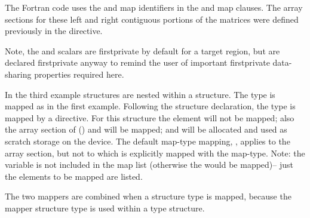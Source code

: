 The Fortran code uses the  and  map identifiers in the
 and  map clauses.  
The array sections for these left and right contiguous portions of the matrices 
were defined previously in the  directive.

Note, the  and  scalars are firstprivate 
by default for a target region, but are declared firstprivate anyway
to remind the user of important firstprivate data-sharing properties required here.



\pagebreak
In the third example  structures are
nested within a  structure. The  type is mapped
as in the first example.  Following the  structure declaration, 
the  type is mapped by a  directive. 
For this structure the  element will not be mapped;
also the array section of  () and  will be mapped; and
 will be allocated and used as scratch storage on the device.
The default map-type mapping, , applies to the  array section,
but not to  which is explicitly mapped with the  map-type. 
Note: the variable  is not included in the map list (otherwise
the  would be mapped)-- just the elements 
to be mapped are listed.

The two mappers are combined when a  structure type is mapped,
because the mapper  structure type is used within a 
type structure.



